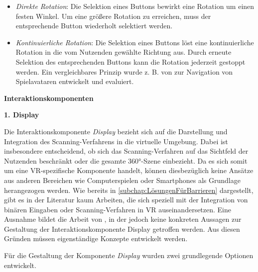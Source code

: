 \begin{itemize}
    \item \textit{Direkte Rotation}: Die Selektion eines Buttons bewirkt eine Rotation um einen festen Winkel. Um eine größere Rotation zu erreichen, muss der entsprechende Button wiederholt selektiert werden.
    \item \textit{Kontinuierliche Rotation}: Die Selektion eines Buttons löst eine kontinuierliche Rotation in die vom Nutzenden gewählte Richtung aus. Durch erneute Selektion des entsprechenden Buttons kann die Rotation jederzeit gestoppt werden. Ein vergleichbares Prinzip wurde z. B. von \citet{10.1145/2159365.2159386} zur Navigation von Spielavataren entwickelt und evaluiert. 
\end{itemize}

{\normalfont \bfseries Interaktionskomponenten}  

\textbf{1. Display}

Die Interaktionskomponente \textit{Display} bezieht sich auf die Darstellung und Integration des Scanning-Verfahrens in die virtuelle Umgebung. Dabei ist insbesondere entscheidend, ob sich das Scanning-Verfahren auf das Sichtfeld der Nutzenden beschränkt oder die gesamte 360°-Szene einbezieht. Da es sich somit um eine VR-spezifische Komponente handelt, können diesbezüglich keine Ansätze aus anderen Bereichen wie Computerspielen oder Smartphones als Grundlage herangezogen werden. Wie bereits in \autoref{subchap:LösungenFürBarrieren} dargestellt, gibt es in der Literatur kaum Arbeiten, die sich speziell mit der Integration von binären Eingaben oder Scanning-Verfahren in VR auseinandersetzen. Eine Ausnahme bildet die Arbeit von \citet{valakou_framework_2024}, in der jedoch keine konkreten Aussagen zur Gestaltung der Interaktionskomponente Display getroffen werden. Aus diesen Gründen müssen eigenständige Konzepte entwickelt werden.

Für die Gestaltung der Komponente \textit{Display} wurden zwei grundlegende Optionen entwickelt.

